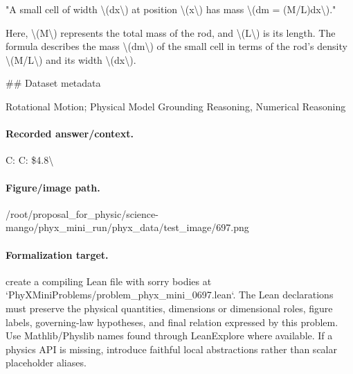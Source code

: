 "A small cell of width \textbackslash{}(dx\textbackslash{}) at position \textbackslash{}(x\textbackslash{}) has mass \textbackslash{}(dm = (M/L)dx\textbackslash{})."

Here, \textbackslash{}(M\textbackslash{}) represents the total mass of the rod, and \textbackslash{}(L\textbackslash{}) is its length. The formula describes the mass \textbackslash{}(dm\textbackslash{}) of the small cell in terms of the rod's density \textbackslash{}(M/L\textbackslash{}) and its width \textbackslash{}(dx\textbackslash{}).

\#\# Dataset metadata

Rotational Motion; Physical Model Grounding Reasoning, Numerical Reasoning

\paragraph{Recorded answer/context.}
C: C: \$4.8\textbackslash{}

\paragraph{Figure/image path.}
/root/proposal\_for\_physic/science-mango/phyx\_mini\_run/phyx\_data/test\_image/697.png

\paragraph{Formalization target.}
create a compiling Lean file with sorry bodies at `PhyXMiniProblems/problem\_phyx\_mini\_0697.lean`. The Lean declarations must preserve the physical quantities, dimensions or dimensional roles, figure labels, governing-law hypotheses, and final relation expressed by this problem.
Use Mathlib/Physlib names found through LeanExplore where available. If a physics API is missing, introduce faithful local abstractions rather than scalar placeholder aliases.

